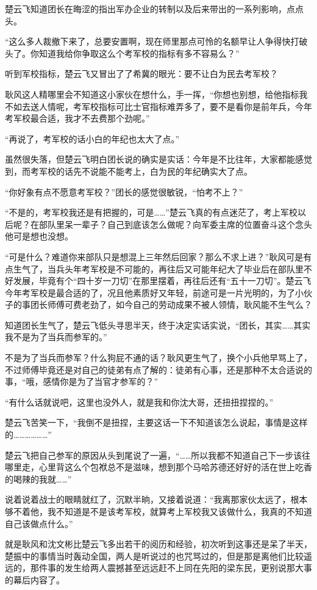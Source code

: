 楚云飞知道团长在晦涩的指出军办企业的转制以及后来带出的一系列影响，点点头。

“这么多人裁撤下来了，总要安置啊，现在师里那点可怜的名额早让人争得快打破头了。你知道我给你争取这么个考军校的指标有多不容易么？”

听到军校指标，楚云飞又冒出了了希冀的眼光：要不让白为民去考军校？

耿风这人精哪里会不知道这小家伙在想什么，手一挥，“你想也别想，给他指标我不如去送人情呢，考军校指标可比士官指标难弄多了，要不是看你是前年兵，今年考军校最合适，我才不去费那个劲呢。”

“再说了，考军校的话小白的年纪也太大了点。”

虽然很失落，但楚云飞明白团长说的确实是实话：今年是不比往年，大家都能感觉到，而考军校的话先不说能不能考上，白为民的年纪确实大了点。

“你好象有点不愿意考军校？”团长的感觉很敏锐，“怕考不上？”

“不是的，考军校我还是有把握的，可是……”楚云飞真的有点迷茫了，考上军校以后呢？在部队里呆一辈子？自己到底该怎么做呢？向军委主席的位置奋斗这个念头他可是想也没想。

“可是什么？难道你来部队只是想混上三年然后回家？那么不求上进？”耿风可是有点生气了，当兵头年考军校是不可能的，再往后又可能年纪大了毕业后在部队里不好发展，毕竟有个“四十岁一刀切”在那里摆着，再往后还有“五十一刀切”。楚云飞今年考军校是最合适的了，况且他素质好又年轻，前途可是一片光明的，为了小伙子的事团长师傅可费老劲了，如今自己的劳动成果不被人领情，耿风能不生气么？

知道团长生气了，楚云飞低头寻思半天，终于决定实话实说，“团长，其实……其实我不是为了当兵而参军的。”

不是为了当兵而参军？什么狗屁不通的话？耿风更生气了，换个小兵他早骂上了，不过师傅毕竟还是对自己的徒弟有点了解的：徒弟有心事，还是那种不太合适说的事，“哦，感情你是为了当官才参军的？”

“有什么话就说吧，这里也没外人，就是我和你沈大哥，还扭扭捏捏的。”

楚云飞苦笑一下，“我倒不是扭捏，主要这话一下不知道该怎么说起，事情是这样的………………”

楚云飞把自己参军的原因从头到尾说了一遍，“……所以我都不知道自己下一步该往哪里走，心里背这么个包袱总不是滋味，想到那个马哈苏德还好好的活在世上吃香的喝辣的我就……”

说着说着战士的眼睛就红了，沉默半晌，又接着说道：“我离那家伙太远了，根本够不着他，我不知道是不是该考军校，就算考上军校我又该做什么，我真的不知道自己该做点什么。”

就是耿风和沈文彬比楚云飞多出若干的阅历和经验，初次听到这事还是呆了半天，楚振中的事情当时轰动全国，两人是听说过的也咒骂过的，但是那是离他们比较遥远的，那件事的发生给两人震撼甚至远远赶不上同在先阳的梁东民，更别说那大事的幕后内容了。

